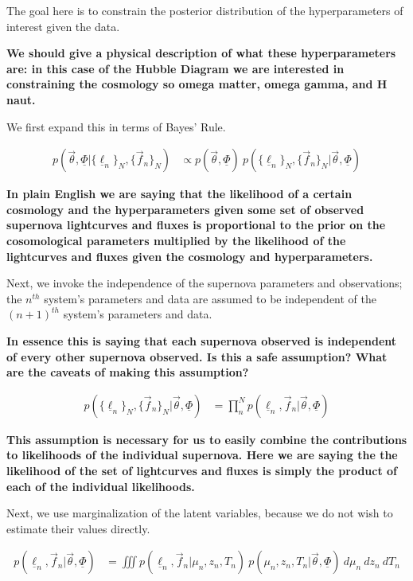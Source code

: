 \documentclass[12pt, onecolumn]{emulateapj}
\newcommand{\textul}{\underline}
\begin{document}
The goal here is to constrain the posterior distribution of the hyperparameters of interest given the data.

{\bf We should give a physical description of what these hyperparameters are: in this case of the Hubble Diagram we are interested in constraining the cosmology so omega matter, omega gamma, and H naut.}

We first expand this in terms of Bayes' Rule.

\begin{align}
p(\vec{\theta}, \textul{\Phi} | \{\textul{\ell}_{n}\}_{N}, \{\vec{f}_{n}\}_{N}) &\propto p(\vec{\theta}, \textul{\Phi})\ p(\{\textul{\ell}_{n}\}_{N}, \{\vec{f}_{n}\}_{N} | \vec{\theta}, \textul{\Phi})
\end{align}

{\bf In plain English we are saying that the likelihood of a certain cosmology and the hyperparameters given some set of observed supernova lightcurves and fluxes is proportional to the prior on the cosomological parameters multiplied by the likelihood of the lightcurves and fluxes given the cosmology and hyperparameters.}

Next, we invoke the independence of the supernova parameters and observations; the $n^{th}$ system's parameters and data are assumed to be independent of the $(n+1)^{th}$ system's parameters and data.

{\bf In essence this is saying that each supernova observed is independent of every other supernova observed. Is this a safe assumption? What are the caveats of making this assumption?}

\begin{align}
p(\{\textul{\ell}_{n}\}_{N}, \{\vec{f}_{n}\}_{N} | \vec{\theta}, \textul{\Phi}) &= \prod_{n}^{N}p(\textul{\ell}_{n}, \vec{f}_{n} | \vec{\theta}, \textul{\Phi})
\end{align}

{\bf This assumption is necessary for us to easily combine the contributions to likelihoods of the individual supernova. Here we are saying the the likelihood of the set of lightcurves and fluxes is simply the product of each of the individual likelihoods.}

Next, we use marginalization of the latent variables, because we do not wish to estimate their values directly.

\begin{align}
p(\textul{\ell}_{n}, \vec{f}_{n} | \vec{\theta}, \textul{\Phi}) &= \iiint p(\textul{\ell}_{n}, \vec{f}_{n} | \mu_{n}, z_{n}, T_{n})\ p(\mu_{n}, z_{n}, T_{n} | \vec{\theta}, \textul{\Phi})\ d\mu_{n}\ dz_{n}\ dT_{n}
\end{align}
\end{document}
